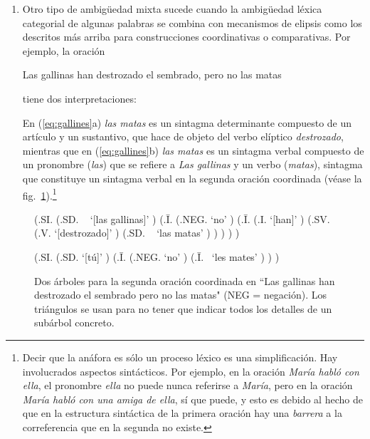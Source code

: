 \begin{enumerate}
\item Otro tipo de ambigüedad mixta sucede cuando la ambigüedad léxica categorial de algunas palabras se combina con mecanismos de elipsis como los descritos más arriba para construcciones coordinativas o comparativas. Por ejemplo, la oración \begin{exemple} Las gallinas han destrozado el sembrado, pero no las matas \end{exemple} tiene dos interpretaciones:  En (\ref{eq:gallines}a) \emph{las matas} es un sintagma determinante compuesto de un artículo y un sustantivo, que hace de objeto del verbo elíptico \emph{destrozado}, mientras que en (\ref{eq:gallines}b) \emph{las matas} es un sintagma verbal compuesto de un pronombre ({\em las}) que se refiere a \emph{Las gallinas} y un verbo ({\em matas}), sintagma que constituye un sintagma verbal en la segunda oración coordinada (véase la fig.~\ref{fg:mates}).\footnote{Decir que la anáfora es sólo un proceso léxico es una simplificación. Hay involucrados aspectos sintácticos. Por ejemplo, en la oración \emph{María habló con ella}, el pronombre \emph{ella} no puede nunca referirse a \emph{María}, pero en la oración \emph{María habló con una amiga de ella}, sí que puede, y esto es debido al hecho de que en la estructura sintáctica de la primera oración hay una \emph{barrera} a la correferencia que en la segunda no existe.} \end{enumerate} 

\begin{figure} \begin{center} \begin{parsetree} (.SI. (.SD. ~ `[las gallinas]' ) (.{\={I}}. (.NEG. `no' ) (.{\={I}}. (.I. `[han]' ) (.SV. (.V. `[destrozado]' ) (.SD. ~ `las matas' ) ) ) ) ) \end{parsetree} \end{center} \begin{center} \begin{parsetree} (.SI. (.SD. `[tú]' ) (.{\={I}}. (.NEG. `no' ) (.{\={I}}. ~`les mates' ) ) ) \end{parsetree} \end{center} \caption{Dos árboles para la segunda oración coordinada en ``Las gallinas han destrozado el sembrado pero no las matas" (NEG = negación). Los triángulos se usan para no tener que indicar todos los detalles de un subárbol concreto.} \label{fg:mates} \end{figure} 

